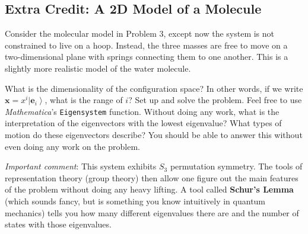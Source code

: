 \documentclass[12pt]{article}
\numberwithin{equation}{subsection}    %
\renewcommand{\vec}[1]{\mathbf{#1}} %
\begin{document}
\subsection{Extra Credit: A 2D Model of a Molecule}


Consider the molecular model in Problem 3, except now the system is not constrained to live on a hoop. Instead, the three masses are free to move on a two-dimensional plane with springs connecting them to one another. This is a slightly more realistic model of the water molecule. 

What is the dimensionality of the configuration space? In other words, if we write $\vec{x} = x^i \left|\vec{e}_i\right\rangle$, what is the range of $i$? Set up and solve the problem. Feel free to use \emph{Mathematica}'s \texttt{Eigensystem} function. Without doing any work, what is the interpretation of the eigenvectors with the lowest eigenvalue? What types of motion do these eigenvectors describe? You should be able to answer this without even doing any work on the problem.

\emph{Important comment}: This system exhibits $S_3$ permutation symmetry. The tools of representation theory (group theory) then allow one figure out the main features of the problem without doing any heavy lifting. A tool called \textbf{Schur's Lemma} (which sounds fancy, but is something you know intuitively in quantum mechanics) tells you how many different eigenvalues there are and the number of states with those eigenvalues. 
\end{document}
